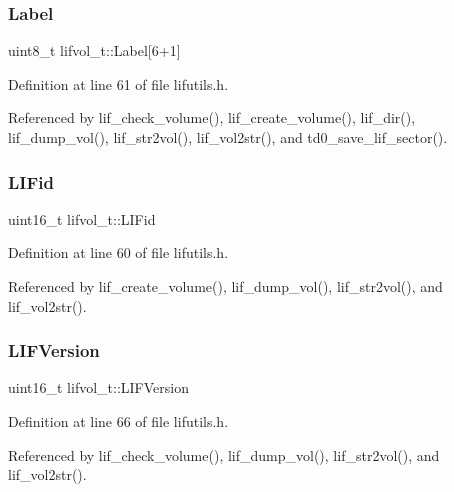 \subsubsection{\texorpdfstring{Label}{Label}}
{\footnotesize\ttfamily uint8\+\_\+t lifvol\+\_\+t\+::\+Label\mbox{[}6+1\mbox{]}}



Definition at line 61 of file lifutils.\+h.



Referenced by lif\+\_\+check\+\_\+volume(), lif\+\_\+create\+\_\+volume(), lif\+\_\+dir(), lif\+\_\+dump\+\_\+vol(), lif\+\_\+str2vol(), lif\+\_\+vol2str(), and td0\+\_\+save\+\_\+lif\+\_\+sector().

\mbox{\label{structlifvol__t_adb6a0c2fff5b765eb12c3eb5db6d5bad}} 
\subsubsection{\texorpdfstring{L\+I\+Fid}{LIFid}}
{\footnotesize\ttfamily uint16\+\_\+t lifvol\+\_\+t\+::\+L\+I\+Fid}



Definition at line 60 of file lifutils.\+h.



Referenced by lif\+\_\+create\+\_\+volume(), lif\+\_\+dump\+\_\+vol(), lif\+\_\+str2vol(), and lif\+\_\+vol2str().

\mbox{\label{structlifvol__t_afffd824a7b0ce6aa8410fa243733475f}} 
\subsubsection{\texorpdfstring{L\+I\+F\+Version}{LIFVersion}}
{\footnotesize\ttfamily uint16\+\_\+t lifvol\+\_\+t\+::\+L\+I\+F\+Version}



Definition at line 66 of file lifutils.\+h.



Referenced by lif\+\_\+check\+\_\+volume(), lif\+\_\+dump\+\_\+vol(), lif\+\_\+str2vol(), and lif\+\_\+vol2str().

\mbox{\label{structlifvol__t_ad245f7419e180934262f53acd9b4349c}} 
